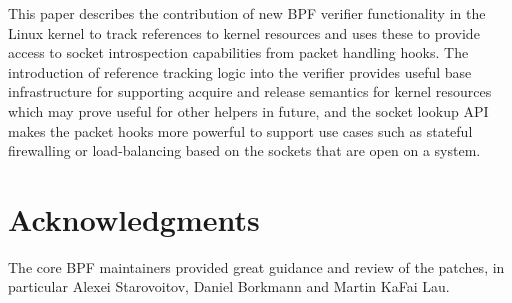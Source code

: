 \documentclass[10pt,sigconf,authorversion]{lpc}
\begin{document}
This paper describes the contribution of new BPF verifier functionality in the
Linux kernel to track references to kernel resources and uses these to provide
access to socket introspection capabilities from packet handling hooks. The
introduction of reference tracking logic into the verifier provides
useful base infrastructure for supporting acquire and release semantics for
kernel resources which may prove useful for other helpers in future, and the
socket lookup API makes the packet hooks more powerful to support use cases
such as stateful firewalling or load-balancing based on the sockets that are
open on a system.

\section{Acknowledgments}

The core BPF maintainers provided great guidance and review of the patches, in
particular Alexei Starovoitov, Daniel Borkmann and Martin KaFai Lau.



\end{document}
